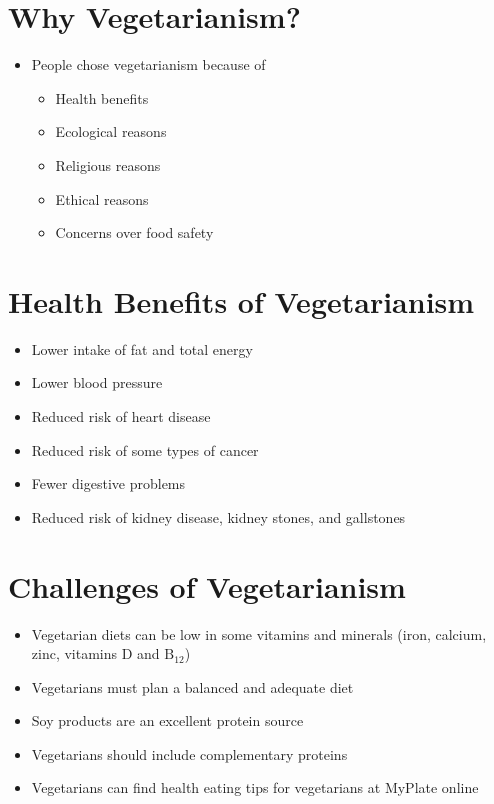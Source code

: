 \documentclass[title={Chapter 6}]{fdsn201notes}
\begin{document}
\section{Why Vegetarianism?}\label{sec:why-vegetarianism?}
\begin{itemize}
	\item People chose vegetarianism because of
	\begin{itemize}
		\item Health benefits
		\item Ecological reasons
		\item Religious reasons
		\item Ethical reasons
		\item Concerns over food safety
	\end{itemize}
\end{itemize}

\section{Health Benefits of Vegetarianism}\label{sec:health-benefits-of-vegetarianism}
\begin{itemize}
	\item Lower intake of fat and total energy
	\item Lower blood pressure
	\item Reduced risk of heart disease
	\item Reduced risk of some types of cancer
	\item Fewer digestive problems
	\item Reduced risk of kidney disease, kidney stones, and gallstones
\end{itemize}

\section{Challenges of Vegetarianism}\label{sec:challenges-of-vegetarianism}
\begin{itemize}
	\item Vegetarian diets can be low in some vitamins and minerals (iron, calcium, zinc, vitamins D and $\mbox{B}_{12}$)
	\item Vegetarians must plan a balanced and adequate diet
	\item Soy products are an excellent protein source
	\item Vegetarians should include complementary proteins
	\item Vegetarians can find health eating tips for vegetarians at MyPlate online
\end{itemize}
\end{document}
